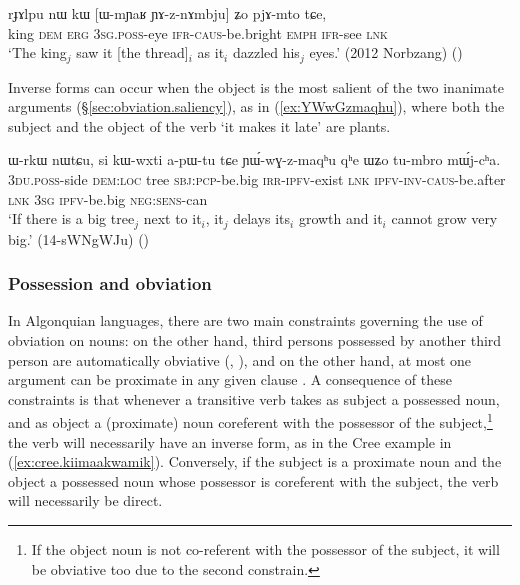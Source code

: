 \begin{exe}
\ex \label{ex:WmYaR.YAznAmbju}
\gll  rɟɤlpu nɯ kɯ [ɯ-mɲaʁ ɲɤ-z-nɤmbju] ʑo pjɤ-mto tɕe,  \\
  king \textsc{dem} \textsc{erg} \textsc{3sg}.\textsc{poss}-eye \textsc{ifr}-\textsc{caus}-be.bright \textsc{emph} \textsc{ifr}-see \textsc{lnk} \\
\glt `The king$_j$ saw it [the thread]$_i$ as it$_i$ dazzled his$_j$ eyes.'  (2012 Norbzang)
()
\end{exe}

Inverse forms can occur when the object is the most salient of the two inanimate arguments (§\ref{sec:obviation.saliency}), as in (\ref{ex:YWwGzmaqhu}), where both the subject and the object of the verb  `it makes it late' are plants.

\begin{exe}
\ex \label{ex:YWwGzmaqhu}
\gll ɯ-rkɯ nɯtɕu, si kɯ-wxti a-pɯ-tu tɕe ɲɯ́-wɣ-z-maqʰu qʰe ɯʑo tu-mbro mɯ́j-cʰa.	\\
\textsc{3du}.\textsc{poss}-side \textsc{dem}:\textsc{loc} tree \textsc{sbj}:\textsc{pcp}-be.big \textsc{irr}-\textsc{ipfv}-exist \textsc{lnk} \textsc{ipfv}-\textsc{inv}-\textsc{caus}-be.after \textsc{lnk} \textsc{3sg} \textsc{ipfv}-be.big \textsc{neg}:\textsc{sens}-can \\
\glt `If there is a big tree$_j$ next to it$_i$, it$_j$ delays its$_i$ growth and it$_i$ cannot grow very big.' (14-sWNgWJu)
()
\end{exe}
  
  
\subsubsection{Possession and obviation} \label{sec:obviation.possessor}
In Algonquian languages, there are two main constraints governing the use of obviation on nouns: on the other hand, third persons possessed by another third person are automatically obviative (\citealt[25]{wolfart73}, \citealt[625]{valentine01grammar}), and on the other hand, at most one argument can be proximate in any given clause  \citep[627]{valentine01grammar}. A consequence of these constraints is that whenever a transitive verb takes as subject a possessed noun, and as object a (proximate) noun coreferent with the possessor of the subject,\footnote{If the object noun is not co-referent with the possessor of the subject, it will be obviative too due to the second constrain. } the verb will necessarily have an inverse form, as in the Cree example in (\ref{ex:cree.kiimaakwamik}). Conversely, if the subject is a proximate noun and the object a possessed noun whose possessor is coreferent with the subject, the verb will necessarily be direct.

